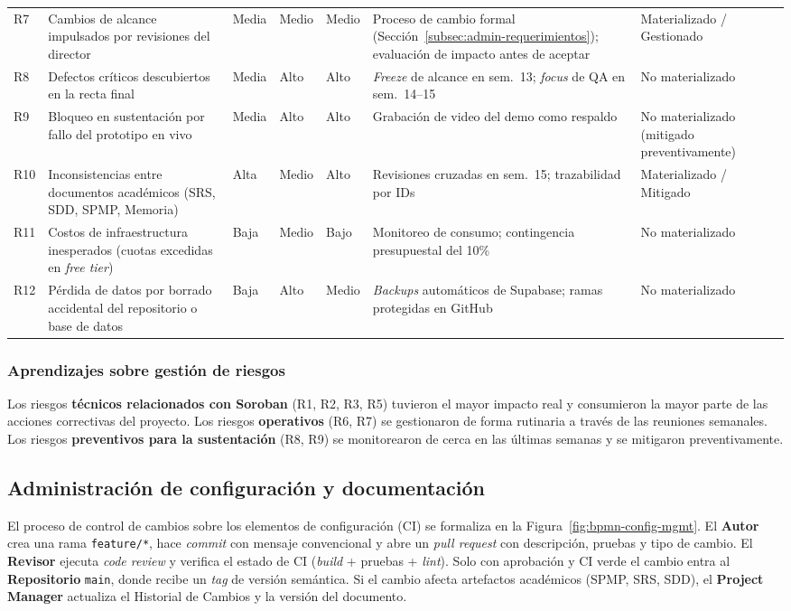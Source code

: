 \documentclass[12pt,oneside]{report}
\begin{document}
\begin{longtable}{@{}p{0.6cm} p{3.8cm} p{1.0cm} p{1.0cm} p{1.0cm} p{4.6cm} p{1.5cm}@{}}
        R7 & Cambios de alcance impulsados por revisiones del director & Media & Medio & Medio & Proceso de cambio formal (Sección~\ref{subsec:admin-requerimientos}); evaluación de impacto antes de aceptar & Materializado / Gestionado\\
        R8 & Defectos críticos descubiertos en la recta final & Media & Alto & Alto & \textit{Freeze} de alcance en sem.~13; \textit{focus} de QA en sem.~14--15 & No materializado\\
        R9 & Bloqueo en sustentación por fallo del prototipo en vivo & Media & Alto & Alto & Grabación de video del demo como respaldo & No materializado (mitigado preventivamente)\\
        R10 & Inconsistencias entre documentos académicos (SRS, SDD, SPMP, Memoria) & Alta & Medio & Alto & Revisiones cruzadas en sem.~15; trazabilidad por IDs & Materializado / Mitigado\\
        R11 & Costos de infraestructura inesperados (cuotas excedidas en \textit{free tier}) & Baja & Medio & Bajo & Monitoreo de consumo; contingencia presupuestal del 10\% & No materializado\\
        R12 & Pérdida de datos por borrado accidental del repositorio o base de datos & Baja & Alto & Medio & \textit{Backups} automáticos de Supabase; ramas protegidas en GitHub & No materializado\\
      \end{longtable}

      \subsubsection{Aprendizajes sobre gestión de riesgos}
      Los riesgos \textbf{técnicos relacionados con Soroban} (R1, R2, R3, R5) tuvieron el mayor impacto real y consumieron la mayor parte de las acciones correctivas del proyecto. Los riesgos \textbf{operativos} (R6, R7) se gestionaron de forma rutinaria a través de las reuniones semanales. Los riesgos \textbf{preventivos para la sustentación} (R8, R9) se monitorearon de cerca en las últimas semanas y se mitigaron preventivamente.

    \subsection{Administración de configuración y documentación}
    \label{subsec:gestion-configuracion}

      El proceso de control de cambios sobre los elementos de configuración (CI) se formaliza en la Figura~\ref{fig:bpmn-config-mgmt}. El \textbf{Autor} crea una rama \texttt{feature/*}, hace \textit{commit} con mensaje convencional y abre un \textit{pull request} con descripción, pruebas y tipo de cambio. El \textbf{Revisor} ejecuta \textit{code review} y verifica el estado de CI (\textit{build} + pruebas + \textit{lint}). Solo con aprobación y CI verde el cambio entra al \textbf{Repositorio} \texttt{main}, donde recibe un \textit{tag} de versión semántica. Si el cambio afecta artefactos académicos (SPMP, SRS, SDD), el \textbf{Project Manager} actualiza el Historial de Cambios y la versión del documento.
\end{document}
